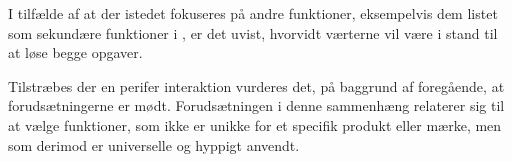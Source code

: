 I tilfælde af at der istedet fokuseres på andre funktioner, eksempelvis dem listet som sekundære funktioner i , er det uvist, hvorvidt værterne vil være i stand til at løse begge opgaver. 

Tilstræbes der en perifer interaktion vurderes det, på baggrund af foregående, at forudsætningerne er mødt. Forudsætningen i denne sammenhæng relaterer sig til at vælge funktioner, som ikke er unikke for et specifik produkt eller mærke, men som derimod er universelle og hyppigt anvendt. 
%
